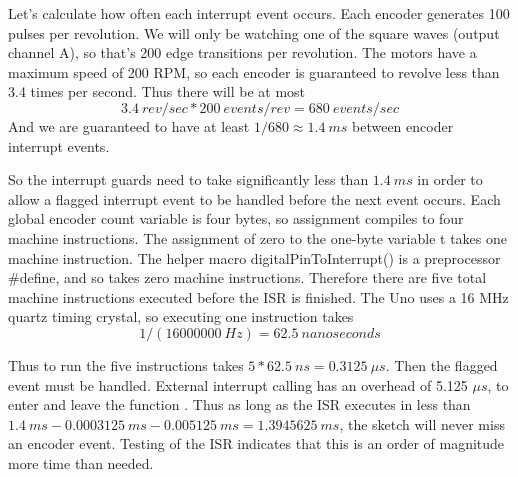 Let's calculate how often each interrupt event occurs. Each encoder generates 100 pulses per revolution. We will only be watching one of the square waves (output channel A), so that's 200 edge transitions per revolution. The motors have a maximum speed of 200 RPM, so each encoder is guaranteed to revolve less than 3.4 times per second. Thus there will be at most \[3.4\ rev/sec * 200\ events/rev = 680\ events/sec\]
And we are guaranteed to have at least \(1 / 680 \approx 1.4\ ms\) between encoder interrupt events.

So the interrupt guards need to take significantly less than \(1.4\ ms\) in order to allow a flagged interrupt event to be handled before the next event occurs. Each global encoder count variable is four bytes, so assignment compiles to four machine instructions. The assignment of zero to the one-byte variable t takes one machine instruction. The helper macro digitalPinToInterrupt() is a preprocessor \#define, and so takes zero machine instructions. Therefore there are five total machine instructions executed before the ISR is finished. The Uno uses a 16 MHz quartz timing crystal, so executing one instruction takes \[1 / (16000000\ Hz) = 62.5\ nanoseconds\]

Thus to run the five instructions takes \(5 * 62.5\ ns = 0.3125\ \mu s\). Then the flagged event must be handled. External interrupt calling has an overhead of 5.125 \(\mu s\), to enter and leave the function \cite{gammonInterrupts}. Thus as long as the ISR executes in less than \(1.4\ ms - 0.0003125\ ms - 0.005125\ ms = 1.3945625\ ms\), the sketch will never miss an encoder event. Testing of the ISR indicates that this is an order of magnitude more time than needed.